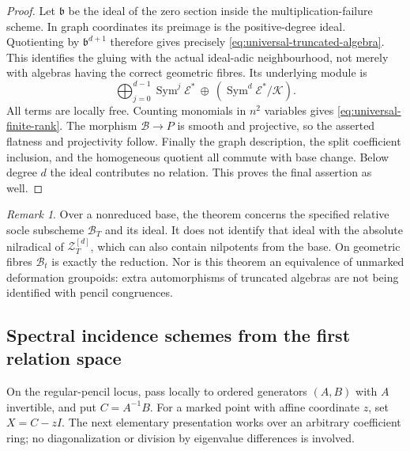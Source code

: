 \documentclass[11pt,reqno]{amsart}
\numberwithin{equation}{section}
\theoremstyle{definition}\newtheorem{definition}[theorem]{Definition}
\theoremstyle{remark}\newtheorem{remark}[theorem]{Remark}
\DeclareMathOperator{\Sym}{Sym}\DeclareMathOperator{\Gr}{Gr}
\begin{document}
\begin{proof}
Let \(\mathfrak b\) be the ideal of the zero section inside the
multiplication-failure scheme.  In graph coordinates its preimage
is the positive-degree ideal.  Quotienting by
\(\mathfrak b^{d+1}\) therefore gives precisely
\eqref{eq:universal-truncated-algebra}.  This identifies the gluing
with the actual ideal-adic neighbourhood, not merely with algebras
having the correct geometric fibres.  Its underlying module is
\[
 \bigoplus_{j=0}^{d-1}\Sym^j\mathcal E^*
       \ \oplus\ (\Sym^d\mathcal E^*/\mathcal K).
\]
All terms are locally free.  Counting monomials in \(n^2\)
variables gives \eqref{eq:universal-finite-rank}.  The morphism
\(\mathcal B\to P\) is smooth and projective, so the asserted
flatness and projectivity follow.  Finally the graph description,
the split coefficient inclusion, and the homogeneous quotient all
commute with base change.  Below degree \(d\) the ideal contributes
no relation.  This proves the final assertion as well.
\end{proof}

\begin{remark}\label{rem:relative-reduction-scope}
Over a nonreduced base, the theorem concerns the specified relative
socle subscheme \(\mathcal B_T\) and its ideal.  It does not identify
that ideal with the absolute nilradical of \(\mathcal Z_T^{[d]}\),
which can also contain nilpotents from the base.  On geometric fibres
\(\mathcal B_t\) is exactly the reduction.  Nor is this theorem an
equivalence of unmarked deformation groupoids: extra automorphisms
of truncated algebras are not being identified with pencil
congruences.
\end{remark}

\subsection{Spectral incidence schemes from the first relation space}

On the regular-pencil locus, pass locally to ordered generators
\((A,B)\) with \(A\) invertible, and put \(C=A^{-1}B\).
For a marked point with affine coordinate \(z\), set \(X=C-zI\).
The next elementary presentation works over an arbitrary coefficient
ring; no diagonalization or division by eigenvalue differences is
involved.
\end{document}
